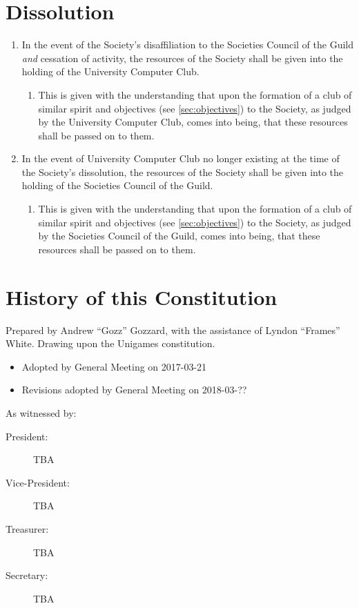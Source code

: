 \documentclass[a4paper]{article}
\begin{document}
\section{Dissolution} \label{sec:dissolution}
\begin{enumerate}
    \item In the event of the Society's disaffiliation to the Societies Council of the Guild \emph{and} cessation of activity, the resources of the Society shall be given into the holding of the University Computer Club.
    \begin{enumerate}
        \item This is given with the understanding that upon the formation of a club of similar spirit and objectives (see \cref{sec:objectives}) to the Society, as judged by the University Computer Club, comes into being, that these resources shall be passed on to them.
    \end{enumerate}
    \item In the event of University Computer Club no longer existing at the time of the Society's dissolution, the resources of the Society shall be given into the holding of the Societies Council of the Guild.
    \begin{enumerate}
        \item This is given with the understanding that upon the formation of a club of similar spirit and objectives (see \cref{sec:objectives}) to the Society, as judged by the Societies Council of the Guild, comes into being, that these resources shall be passed on to them.
    \end{enumerate}
\end{enumerate}

\appendixpage

\appendix \section{History of this Constitution} \label{app:history}

\noindent Prepared by Andrew ``Gozz'' Gozzard, with the assistance of Lyndon ``Frames'' White. Drawing upon the Unigames constitution.

\medskip{}

\begin{itemize}
	\item[] Adopted by General Meeting on 2017-03-21
    \item[] Revisions adopted by General Meeting on 2018-03-??
\end{itemize}

\medskip{}

\noindent As witnessed by:
\begin{description}
\item [{President:}] TBA \hrulefill
\item [{Vice-President:}] TBA \hrulefill
\item [{Treasurer:}] TBA \hrulefill
\item [{Secretary:}] TBA \hrulefill
\end{description}
\end{document}
